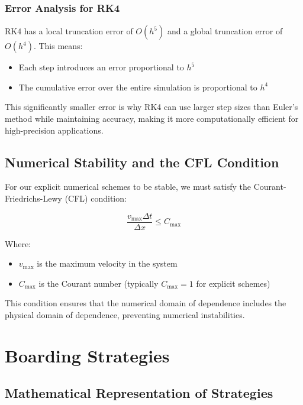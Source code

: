\documentclass[a4paper,12pt]{article}
\begin{document}
\subsubsection{Error Analysis for RK4}

RK4 has a local truncation error of $O(h^5)$ and a global truncation error of $O(h^4)$. This means:
\begin{itemize}
    \item Each step introduces an error proportional to $h^5$
    \item The cumulative error over the entire simulation is proportional to $h^4$
\end{itemize}

This significantly smaller error is why RK4 can use larger step sizes than Euler's method while maintaining accuracy, making it more computationally efficient for high-precision applications.

\subsection{Numerical Stability and the CFL Condition}

For our explicit numerical schemes to be stable, we must satisfy the Courant-Friedrichs-Lewy (CFL) condition:

\begin{equation}
\frac{v_{\max} \Delta t}{\Delta x} \leq C_{\max}
\end{equation}

Where:
\begin{itemize}
    \item $v_{\max}$ is the maximum velocity in the system
    \item $C_{\max}$ is the Courant number (typically $C_{\max} = 1$ for explicit schemes)
\end{itemize}

This condition ensures that the numerical domain of dependence includes the physical domain of dependence, preventing numerical instabilities.

\section{Boarding Strategies}

\subsection{Mathematical Representation of Strategies}
\end{document}
